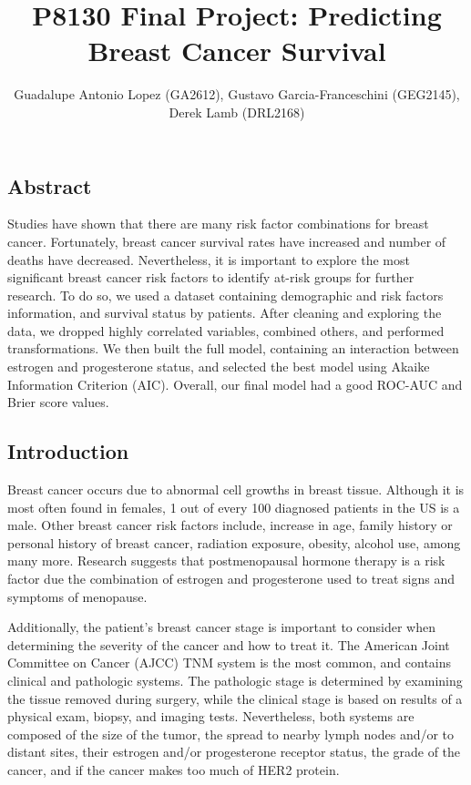 \documentclass[
]{article}
\title{P8130 Final Project: Predicting Breast Cancer Survival}
\author{Guadalupe Antonio Lopez (GA2612), Gustavo Garcia-Franceschini
(GEG2145), Derek Lamb (DRL2168)}
\date{}
\begin{document}
\maketitle

\hypertarget{abstract}{%
\subsection{Abstract}\label{abstract}}

Studies have shown that there are many risk factor combinations for
breast cancer. Fortunately, breast cancer survival rates have increased
and number of deaths have decreased. Nevertheless, it is important to
explore the most significant breast cancer risk factors to identify
at-risk groups for further research. To do so, we used a dataset
containing demographic and risk factors information, and survival status
by patients. After cleaning and exploring the data, we dropped highly
correlated variables, combined others, and performed transformations. We
then built the full model, containing an interaction between estrogen
and progesterone status, and selected the best model using Akaike
Information Criterion (AIC). Overall, our final model had a good ROC-AUC
and Brier score values.

\hypertarget{introduction}{%
\subsection{Introduction}\label{introduction}}

Breast cancer occurs due to abnormal cell growths in breast tissue.
Although it is most often found in females, 1 out of every 100 diagnosed
patients in the US is a male. Other breast cancer risk factors include,
increase in age, family history or personal history of breast cancer,
radiation exposure, obesity, alcohol use, among many more. Research
suggests that postmenopausal hormone therapy is a risk factor due the
combination of estrogen and progesterone used to treat signs and
symptoms of menopause.

Additionally, the patient's breast cancer stage is important to consider
when determining the severity of the cancer and how to treat it. The
American Joint Committee on Cancer (AJCC) TNM system is the most common,
and contains clinical and pathologic systems. The pathologic stage is
determined by examining the tissue removed during surgery, while the
clinical stage is based on results of a physical exam, biopsy, and
imaging tests. Nevertheless, both systems are composed of the size of
the tumor, the spread to nearby lymph nodes and/or to distant sites,
their estrogen and/or progesterone receptor status, the grade of the
cancer, and if the cancer makes too much of HER2 protein.
\end{document}
